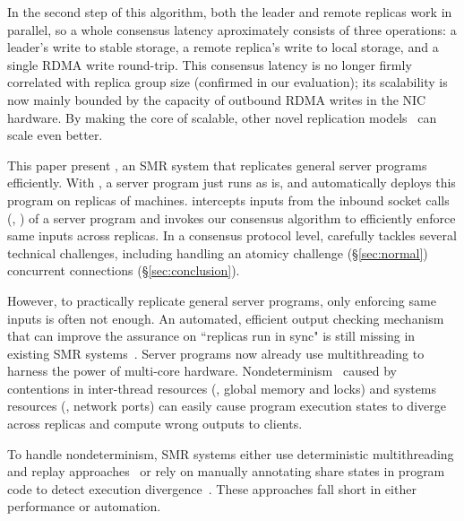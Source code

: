 In the second step of this algorithm, both the leader and remote replicas work 
in parallel, so a whole consensus latency aproximately consists of 
three operations: a leader's write to stable storage, a remote replica's write 
to local storage, and a single RDMA write round-trip. This consensus latency is 
no longer firmly correlated with replica group size (confirmed in our 
evaluation); its scalability is now mainly bounded by the capacity of 
outbound RDMA writes in the NIC hardware. By making the core of \paxos 
scalable, other novel replication 
models~\cite{epaxos:sosp13,mencius:osdi08,scatter:sosp11,manos:hotdep10} can 
scale even better.

This paper present \xxx, an SMR system that replicates general server programs 
efficiently. With \xxx, a server program just runs as is, and \xxx 
automatically deploys this program on replicas of machines. \xxx intercepts 
inputs from the inbound socket calls (\eg, \recv) of a server program and 
invokes our \paxos consensus algorithm to efficiently enforce same inputs 
across replicas. In a consensus protocol level, \xxx carefully tackles several 
technical challenges, including handling an atomicy challenge 
(\S\ref{sec:normal}) concurrent connections (\S\ref{sec:conclusion}).


However, to practically replicate general server programs, only enforcing same 
inputs is often not enough. An automated, efficient output checking mechanism 
that can improve the assurance on ``replicas run in sync" is still missing in 
existing SMR 
systems~\cite{calvin:sigmod12,rex:eurosys14,crane:sosp15,dare:hpdc15}. Server 
programs now already use multithreading to harness the power of multi-core 
hardware. Nondeterminism~\cite{racepro:sosp11,dmp:asplos09,coredet:asplos10,
cui:tern:osdi10, kendo:asplos09,
dthreads:sosp11,peregrine:sosp11,parrot:sosp13,determinator:osdi10} caused by 
contentions in inter-thread resources (\eg, global memory and locks) and systems 
resources (\eg, network ports) can easily cause program execution states to 
diverge across replicas and compute wrong outputs to clients.

To handle nondeterminism, SMR systems either use deterministic multithreading 
and replay approaches~\cite{rex:eurosys14,crane:sosp15,ddos:asplos13} or rely 
on manually annotating share states in program code to detect execution 
divergence~\cite{eve:osdi12}. These approaches fall short in either performance 
or automation.


